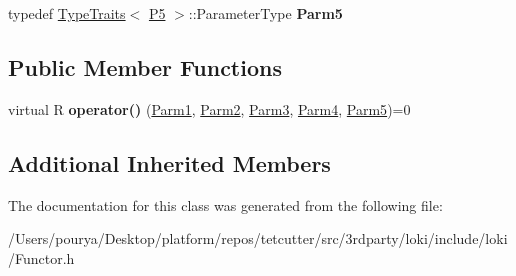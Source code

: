 \begin{DoxyCompactItemize}
\item 
\hypertarget{classLoki_1_1FunctorImpl_3_01R_00_01LOKI__TYPELIST__5_07P1_00_01P2_00_01P3_00_01P4_00_01P5_08_00_01ThreadingModel_01_4_a376482272ebafcf8267274bcb592e038}{}typedef \hyperlink{classLoki_1_1TypeTraits}{Type\+Traits}$<$ \hyperlink{structP5}{P5} $>$\+::Parameter\+Type {\bfseries Parm5}\label{classLoki_1_1FunctorImpl_3_01R_00_01LOKI__TYPELIST__5_07P1_00_01P2_00_01P3_00_01P4_00_01P5_08_00_01ThreadingModel_01_4_a376482272ebafcf8267274bcb592e038}

\end{DoxyCompactItemize}
\subsection*{Public Member Functions}
\begin{DoxyCompactItemize}
\item 
\hypertarget{classLoki_1_1FunctorImpl_3_01R_00_01LOKI__TYPELIST__5_07P1_00_01P2_00_01P3_00_01P4_00_01P5_08_00_01ThreadingModel_01_4_aa5638fd557176ed99856351671b47d68}{}virtual R {\bfseries operator()} (\hyperlink{classLoki_1_1EmptyType}{Parm1}, \hyperlink{classLoki_1_1EmptyType}{Parm2}, \hyperlink{classLoki_1_1EmptyType}{Parm3}, \hyperlink{classLoki_1_1EmptyType}{Parm4}, \hyperlink{classLoki_1_1EmptyType}{Parm5})=0\label{classLoki_1_1FunctorImpl_3_01R_00_01LOKI__TYPELIST__5_07P1_00_01P2_00_01P3_00_01P4_00_01P5_08_00_01ThreadingModel_01_4_aa5638fd557176ed99856351671b47d68}

\end{DoxyCompactItemize}
\subsection*{Additional Inherited Members}


The documentation for this class was generated from the following file\+:\begin{DoxyCompactItemize}
\item 
/\+Users/pourya/\+Desktop/platform/repos/tetcutter/src/3rdparty/loki/include/loki/Functor.\+h\end{DoxyCompactItemize}
